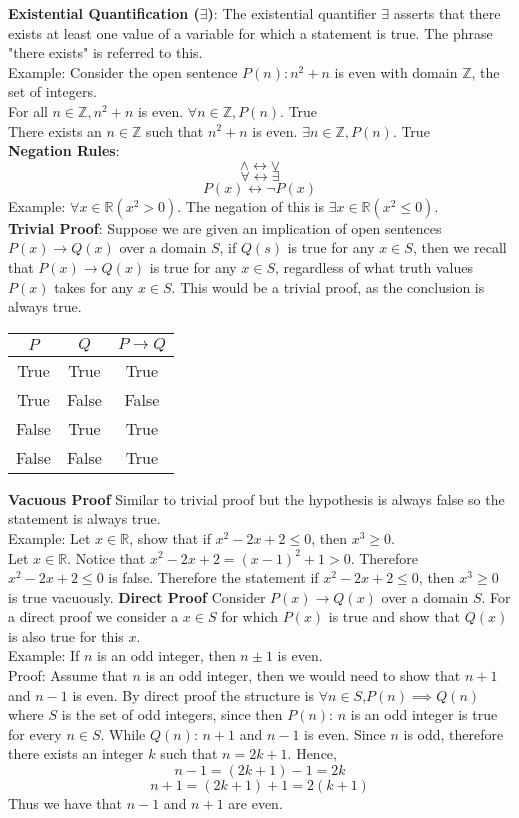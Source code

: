\documentclass{article}
\begin{document}
\textbf{Existential Quantification (\(\exists\))}: The existential quantifier \(\exists\) asserts that there exists at least one value of a variable for which a statement is true. The phrase "there exists" is referred to this.\\
Example: Consider the open sentence \(P(n): n^2+n\) is even with domain \(\mathbb{Z}\), the set of integers.\\
For all \(n \in \mathbb{Z}, n^2+n\) is even. \(\forall n \in \mathbb{Z}, P(n)\). True\\
There exists an \(n \in \mathbb{Z}\) such that \(n^2+n\) is even. \(\exists n \in \mathbb{Z}, P(n)\). True\\
\textbf{Negation Rules}:
\[\land \leftrightarrow \lor\]
\[\forall \leftrightarrow \exists\]
\[P(x) \leftrightarrow \neg P(x)\]
Example: \(\forall x \in \mathbb{R} (x^2 > 0)\). The negation of this is \(\exists x \in \mathbb{R} (x^2 \leq 0)\).\\
\textbf{Trivial Proof}: Suppose we are given an implication of open sentences \(P(x) \rightarrow Q(x)\) over a domain \(S\), if \(Q(s)\) is true for any \(x \in S\), then we recall that \(P(x) \rightarrow Q(x)\) is true for any \(x \in S\), regardless of what truth values \(P(x)\) takes for any \(x \in S\). This would be a trivial proof, as the conclusion is always true.
\begin{center}
\begin{tabular}{|c|c|c|}
\hline
\(P\) & \(Q\) & \(P \rightarrow Q\) \\
\hline
True & True & True \\
True & False & False \\
False & True & True \\
False & False & True \\
\hline
\end{tabular}
\end{center}
\textbf{Vacuous Proof} Similar to trivial proof but the hypothesis is always false so the statement is always true.\\
Example: Let \(x \in \mathbb{R}\), show that if \(x^2-2x+2 \leq 0\), then \(x^3 \geq 0\).\\
Let \(x \in \mathbb{R}\). Notice that \(x^2-2x+2 = (x-1)^2+1 > 0\). Therefore \(x^2-2x+2 \leq 0\) is false. Therefore the statement if \(x^2-2x+2 \leq 0\), then \(x^3 \geq 0\) is true vacuously.
\textbf{Direct Proof} Consider \(P(x) \rightarrow Q(x)\) over a domain \(S\). For a direct proof we consider a \(x \in S\) for which \(P(x)\) is true and show that \(Q(x)\) is also true for this \(x\).\\
Example: If \(n\) is an odd integer, then \(n\pm1\) is even.\\
Proof: Assume that \(n\) is an odd integer, then we would need to show that \(n+1\) and \(n-1\) is even. By direct proof the structure is \(\forall n \in S\),\(P(n) \implies Q(n)\) where \(S\) is the set of odd integers, since then \(P(n)\): \(n\) is an odd integer is true for every \(n \in S\). While \(Q(n)\): \(n+1\) and \(n-1\) is even. Since \(n\) is odd, therefore there exists an integer \(k\) such that \(n = 2k+1\). Hence, 
\[n-1 = (2k+1)-1 = 2k\]
\[n+1 = (2k+1)+1 = 2(k+1)\]
Thus we have that \(n-1\) and \(n+1\) are even.
\end{document}
